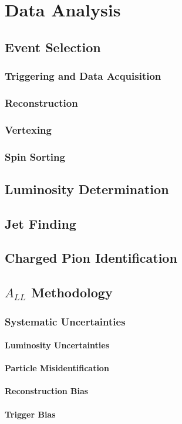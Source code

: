 \chapter{Data Analysis}

\section{Event Selection}

\subsection{Triggering and Data Acquisition}

\subsection{Reconstruction}

\subsection{Vertexing}

\subsection{Spin Sorting}

\section{Luminosity Determination}

\section{Jet Finding}

\section{Charged Pion Identification}

\section{$A_{LL}$ Methodology}

\subsection{Systematic Uncertainties}

\subsubsection{Luminosity Uncertainties}

\subsubsection{Particle Misidentification}

\subsubsection{Reconstruction Bias}

\subsubsection{Trigger Bias}
